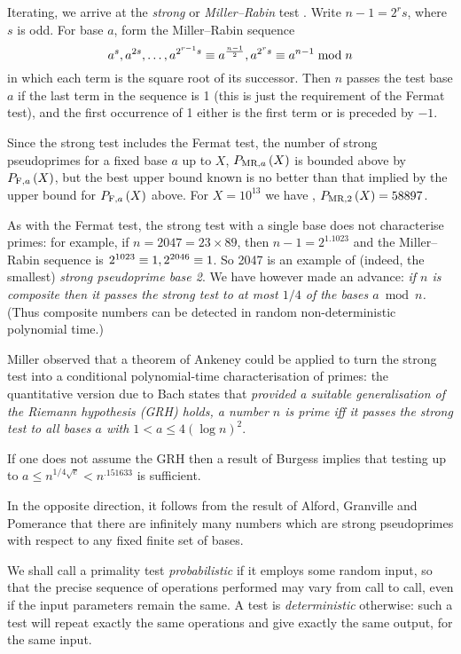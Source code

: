 Iterating, we arrive at the {\it strong} or {\it Miller--Rabin} test \cite{28,39}.
Write $n-1 = 2^r s$, where $s$ is odd.  For base $a$, form the Miller--Rabin
sequence
$$
a^s, a^{2s}, \ldots, a^{2^{r-1}s} \equiv a^{n-1 \over 2}, a^{2^rs} \equiv a^{n-1}
\bmod n
$$
in which each term is the square root of its successor.
Then $n$ passes the test base $a$ if the last term in the sequence is 1
(this is just the requirement of the Fermat test), and the first occurrence
of 1 either is the first term or is preceded by $-1$.

Since the strong test includes the Fermat test, the number of strong
pseudoprimes for a fixed base $a$
up to $X$, $\P MR,a(X)$ is bounded above by $\P F,a(X)$, but the best upper bound
known is no better than that implied by the upper bound for $\P F,a(X)$ above.
For $X = 10^{13}$ we have \cite{10},\cite{33} $\P MR,2(X) = 58897$.

As with the Fermat test, the strong test with a single base does not characterise
primes: for example, if $n = 2047 = 23 \times 89$, then $n-1 = 2^1.1023$ and
the Miller--Rabin sequence is $2^{1023} \equiv 1, 2^{2046} \equiv 1$.
So 2047 is an example of (indeed, the smallest) {\it strong pseudoprime base 2}.
We have however made an advance: {\sl if $n$ is composite then it passes the
strong test to at most $1/4$ of the bases $a \bmod n$.}  (Thus
composite numbers can be detected in random non-deterministic polynomial time.)

Miller \cite{28} observed that a theorem of Ankeney \cite{2} could be applied 
to turn the strong test into a conditional polynomial-time characterisation of primes: 
the quantitative version due to Bach \cite{7}
states that {\sl provided a suitable generalisation of the Riemann hypothesis
(GRH) holds, a number $n$ is prime iff it passes the strong test to all
bases $a$ with $1 < a \le 4(\log n)^2$}.

If one does not assume the GRH then a result of Burgess \cite{14}
implies that testing up to $a \le n^{1/4\sqrt{e}} < n^{.151633}$ is sufficient.

In the opposite direction, it follows from the result of Alford, Granville and
Pomerance \cite{1,22} that there are infinitely many numbers which are strong
pseudoprimes with respect to any fixed finite set of bases.

We shall call a primality test {\it probabilistic} if it employs some
random input, so that the precise sequence of operations performed may
vary from call to call, even if the input parameters remain the same.
A test is {\it deterministic} otherwise: such a test will repeat exactly the
same operations and give exactly the same output, for the same input.

